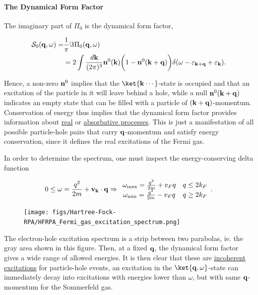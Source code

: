 \paragraph{The Dynamical Form Factor}

The imaginary part of $\Pi_0$ is the dynamical form factor,

\begin{equation}
    \begin{split}
        \mathcal{S}_{0}({\bf q}, \omega) =& \frac{1}{\pi} \Im{\Pi_0({\bf q}, \omega)} \\
        &= 2 \int \frac{d{\bf k}}{(2\pi)^3} {\bf n}^{0}({\bf k}) \bigg(1-{\bf n}^{0}({\bf k+q})\bigg) \delta(\omega - \varepsilon_{{\bf k+q}} + \varepsilon_{{\bf k}}).
    \end{split}
\end{equation}

Hence, a non-zero ${\bf n}^{0}$ implies that the $\ket{{\bf k} \cdots}$-state is occupied and that an excitation of the particle in it will leave behind a hole, while a null ${\bf n}^{0}({\bf k+q})$ indicates an empty state that can be filled with a particle of $({\bf k+q})$-momentum. Conservation of energy thus implies that the dynamical form factor provides information about \underline{real} or \underline{absorbative processes}. This is just a manifestation of all possible particle-hole pairs that carry ${\bf q}$-momentum and satisfy energy conservation, since it defines the real excitations of the Fermi gas.

In order to determine the spectrum, one must inspect the energy-conserving delta function

\begin{equation}
    0 \leq \omega = \frac{q^2}{2m} + {\bf v_k} \cdot {\bf q} \Rightarrow \begin{array}{cc}
         \omega_{\textnormal{max}} = \frac{q^2}{2m} + v_F q & q \leq 2k_F \\
         \omega_{\textnormal{min}} = \frac{q^2}{2m} - v_F q & q \geq 2k_F
    \end{array}.
\end{equation}

\begin{figure}
\texttt{[image: figs/Hartree-Fock-RPA/HFRPA\_Fermi\_gas\_excitation\_spectrum.png]}
\end{figure}  

The electron-hole excitation spectrum is a strip between two parabolas, ie. the gray area shown in this figure. Then, at a fixed ${\bf q}$, the dynamical form factor gives a wide range of allowed energies. It is then clear that these are \underline{incoherent excitations} for particle-hole events, an excitation in the $\ket{{\bf q}, \omega}$-state can immediately decay into excitations with energies lower than $\omega$, but with same ${\bf q}$-momentum for the Sommerfeld gas. 

